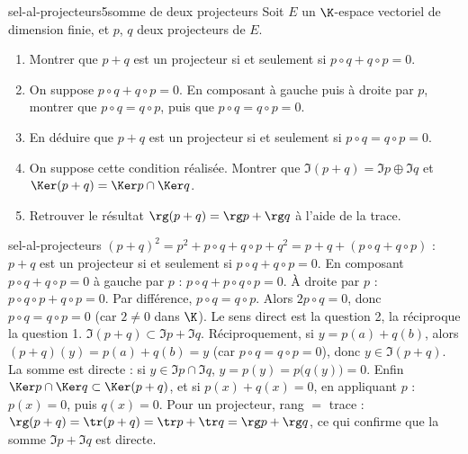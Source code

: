 \begin{exo}{sel-al-projecteurs}{5}{somme de deux projecteurs}
Soit $E$ un $\K$-espace vectoriel de dimension finie, et $p$, $q$ deux projecteurs de $E$.
\begin{enumerate}
\item Montrer que $p+q$ est un projecteur si et seulement si $p\circ q+q\circ p=0$.
\item On suppose $p\circ q+q\circ p=0$. En composant à gauche puis à droite par $p$, montrer que $p\circ q=q\circ p$, puis que
$p\circ q=q\circ p=0$.
\item En déduire que $p+q$ est un projecteur si et seulement si $p\circ q=q\circ p=0$.
\item On suppose cette condition réalisée. Montrer que $\Im(p+q)=\Im p\oplus\Im q$ et $\Ker(p+q)=\Ker p\cap\Ker q$.
\item Retrouver le résultat $\rg(p+q)=\rg p+\rg q$ à l'aide de la trace.
\end{enumerate}
\end{exo}

\begin{corrige}{sel-al-projecteurs}
 $(p+q)^2=p^2+p\circ q+q\circ p+q^2=p+q+(p\circ q+q\circ p)$ : $p+q$ est un projecteur si et seulement si $p\circ q+q\circ p=0$.
 En composant $p\circ q+q\circ p=0$ à gauche par $p$ : $p\circ q+p\circ q\circ p=0$. À droite par $p$ : $p\circ q\circ p+q\circ p=0$.
Par différence, $p\circ q=q\circ p$. Alors $2p\circ q=0$, donc $p\circ q=q\circ p=0$ (car $2\neq0$ dans $\K$).
 Le sens direct est la question 2, la réciproque la question 1.
 $\Im(p+q)\subset\Im p+\Im q$. Réciproquement, si $y=p(a)+q(b)$, alors $(p+q)(y)=p(a)+q(b)=y$ (car $p\circ q=q\circ p=0$),
donc $y\in\Im(p+q)$. La somme est directe : si $y\in\Im p\cap\Im q$, $y=p(y)=p\big(q(y)\big)=0$. Enfin $\Ker p\cap\Ker q\subset\Ker(p+q)$,
et si $p(x)+q(x)=0$, en appliquant $p$ : $p(x)=0$, puis $q(x)=0$.
 Pour un projecteur, rang $=$ trace : $\rg(p+q)=\tr(p+q)=\tr p+\tr q=\rg p+\rg q$, ce qui confirme que la somme
$\Im p+\Im q$ est directe.
\end{corrige}
